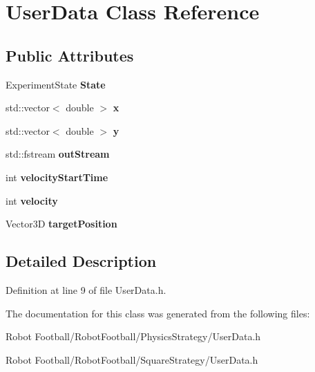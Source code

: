 \hypertarget{class_user_data}{\section{User\-Data Class Reference}
\label{class_user_data}
}
\subsection*{Public Attributes}
\begin{DoxyCompactItemize}
\item 
\hypertarget{class_user_data_a5a017dbe5ecaa3adbcdac7a16a153366}{Experiment\-State {\bfseries State}}\label{class_user_data_a5a017dbe5ecaa3adbcdac7a16a153366}

\item 
\hypertarget{class_user_data_ad9fecbd19b3e63c9410a7bc421ac490f}{std\-::vector$<$ double $>$ {\bfseries x}}\label{class_user_data_ad9fecbd19b3e63c9410a7bc421ac490f}

\item 
\hypertarget{class_user_data_a45fc6da0530d9a1d172e064934063ffa}{std\-::vector$<$ double $>$ {\bfseries y}}\label{class_user_data_a45fc6da0530d9a1d172e064934063ffa}

\item 
\hypertarget{class_user_data_a84cac0303f462eb683423c078abdb719}{std\-::fstream {\bfseries out\-Stream}}\label{class_user_data_a84cac0303f462eb683423c078abdb719}

\item 
\hypertarget{class_user_data_aa6417945ccb41f6bada32f040894863c}{int {\bfseries velocity\-Start\-Time}}\label{class_user_data_aa6417945ccb41f6bada32f040894863c}

\item 
\hypertarget{class_user_data_a0d9dc7cb1894e73f49f112eacf2bf461}{int {\bfseries velocity}}\label{class_user_data_a0d9dc7cb1894e73f49f112eacf2bf461}

\item 
\hypertarget{class_user_data_ae8d270c27626b825085dbe0a292e3dd8}{Vector3\-D {\bfseries target\-Position}}\label{class_user_data_ae8d270c27626b825085dbe0a292e3dd8}

\end{DoxyCompactItemize}


\subsection{Detailed Description}


Definition at line 9 of file User\-Data.\-h.



The documentation for this class was generated from the following files\-:\begin{DoxyCompactItemize}
\item 
Robot Football/\-Robot\-Football/\-Physics\-Strategy/User\-Data.\-h\item 
Robot Football/\-Robot\-Football/\-Square\-Strategy/User\-Data.\-h\end{DoxyCompactItemize}
